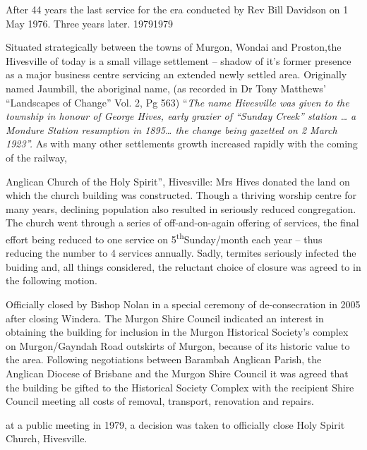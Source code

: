 After 44 years the last service for the era conducted by Rev Bill Davidson on 1 May 1976. Three years later. 19791979



Situated strategically between the towns of Murgon, Wondai and Proston,the Hivesville of today is a small village settlement -- shadow of it's former presence as a major business centre servicing an extended newly settled area. Originally named Jaumbill, the aboriginal name, (as recorded in Dr Tony Matthews' ``Landscapes of Change'' Vol. 2, Pg 563) ``\emph{The name Hivesville was given to the township in honour of George Hives, early grazier of ``Sunday Creek'' station \ldots{} a Mondure Station resumption in 1895\ldots{} the change being gazetted on 2 March 1923''.} As with many other settlements growth increased rapidly with the coming of the railway,



Anglican Church of the Holy Spirit'', Hivesville: Mrs Hives donated the land on which the church building was constructed. Though a thriving worship centre for many years, declining population also resulted in seriously reduced congregation. The church went through a series of off-and-on-again offering of services, the final effort being reduced to one service on 5\textsuperscript{th}Sunday/month each year -- thus reducing the number to 4 services annually. Sadly, termites seriously infected the buiding and, all things considered, the reluctant choice of closure was agreed to in the following motion.



Officially closed by Bishop Nolan in a special ceremony of de-consecration in 2005 after closing Windera. The Murgon Shire Council indicated an interest in obtaining the building for inclusion in the Murgon Historical Society's complex on Murgon/Gayndah Road outskirts of Murgon, because of its historic value to the area. Following negotiations between Barambah Anglican Parish, the Anglican Diocese of Brisbane and the Murgon Shire Council it was agreed that the building be gifted to the Historical Society Complex with the recipient Shire Council meeting all costs of removal, transport, renovation and repairs.



at a public meeting in 1979, a decision was taken to officially close Holy Spirit Church, Hivesville.



